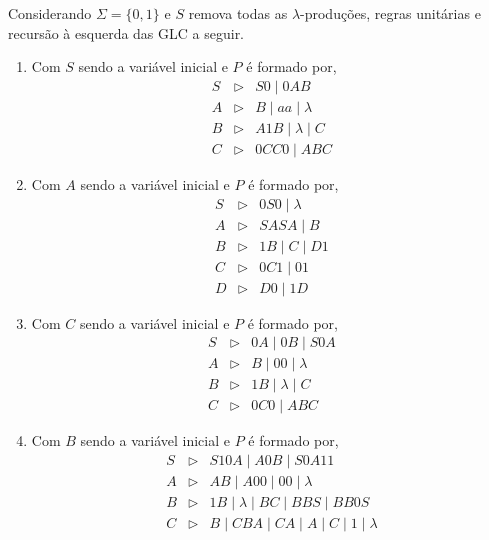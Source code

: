 \begin{problemset}
    \item Considerando $\Sigma = \{0, 1\}$ e $S$  remova todas as $\lambda$-produções, regras unitárias e recursão à esquerda das GLC a seguir.
    \begin{enumerate}
        \item Com $S$ sendo a variável inicial e $P$ é formado por,
        \begin{eqnarray*}
            S & \rhd & S0 \mid 0AB\\
            A & \rhd & B \mid aa \mid \lambda\\
            B & \rhd & A1B \mid \lambda \mid C \\
            C & \rhd & 0CC0 \mid ABC
        \end{eqnarray*}
        
        \item Com $A$ sendo a variável inicial e $P$ é formado por,
        \begin{eqnarray*}
            S & \rhd & 0S0 \mid \lambda\\
            A & \rhd & SASA \mid B\\
            B & \rhd & 1B \mid C \mid D1 \\
            C & \rhd & 0C1 \mid 01\\
            D & \rhd & D0 \mid 1D
        \end{eqnarray*}
        
        \item Com $C$ sendo a variável inicial e $P$ é formado por,
        \begin{eqnarray*}
            S & \rhd & 0A \mid 0B \mid S0A\\
            A & \rhd & B \mid 00 \mid \lambda\\
            B & \rhd & 1B \mid \lambda \mid C \\
            C & \rhd & 0C0 \mid ABC
        \end{eqnarray*}
        
        \item Com $B$ sendo a variável inicial e $P$ é formado por,
        \begin{eqnarray*}
            S & \rhd & S10A \mid A0B \mid S0A11\\
            A & \rhd & AB \mid A00 \mid 00 \mid \lambda\\
            B & \rhd & 1B \mid \lambda \mid BC \mid BBS \mid BB0S \\
            C & \rhd & B \mid CBA \mid CA \mid A \mid C \mid 1 \mid \lambda
        \end{eqnarray*}
    \end{enumerate}
    

\end{problemset}
